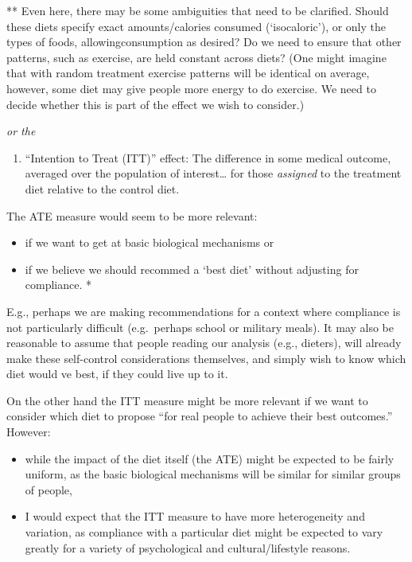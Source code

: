 \documentclass[]{article}
\providecommand{\tightlist}{%
  \setlength{\itemsep}{0pt}\setlength{\parskip}{0pt}}
\begin{document}
** Even here, there may be some ambiguities that need to be clarified.
Should these diets specify exact amounts/calories consumed
(`isocaloric'), or only the types of foods, allowingconsumption as
desired? Do we need to ensure that other patterns, such as exercise, are
held constant across diets? (One might imagine that with random
treatment exercise patterns will be identical on average, however, some
diet may give people more energy to do exercise. We need to decide
whether this is part of the effect we wish to consider.)

\emph{or the}

\begin{enumerate}
\def\labelenumi{\arabic{enumi}.}
\setcounter{enumi}{1}
\tightlist
\item
  ``Intention to Treat (ITT)'' effect: The difference in some medical
  outcome, averaged over the population of interest\ldots{} for those
  \emph{assigned} to the treatment diet relative to the control diet.
\end{enumerate}

The ATE measure would seem to be more relevant:

\begin{itemize}
\tightlist
\item
  if we want to get at basic biological mechanisms or
\item
  if we believe we should recommed a `best diet' without adjusting for
  compliance. *
\end{itemize}

E.g., perhaps we are making recommendations for a context where
compliance is not particularly difficult (e.g.~perhaps school or
military meals). It may also be reasonable to assume that people reading
our analysis (e.g., dieters), will already make these self-control
considerations themselves, and simply wish to know which diet would ve
best, if they could live up to it.

On the other hand the ITT measure might be more relevant if we want to
consider which diet to propose ``for real people to achieve their best
outcomes.'' However:

\begin{itemize}
\item
  while the impact of the diet itself (the ATE) might be expected to be
  fairly uniform, as the basic biological mechanisms will be similar for
  similar groups of people,
\item
  I would expect that the ITT measure to have more heterogeneity and
  variation, as compliance with a particular diet might be expected to
  vary greatly for a variety of psychological and cultural/lifestyle
  reasons.
\end{itemize}
\end{document}
